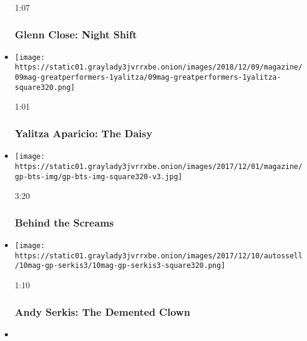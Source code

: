 \begin{itemize}
  1:07

  \hypertarget{glenn-close-night-shift}{%
  \subsubsection{Glenn Close: Night
  Shift}\label{glenn-close-night-shift}}
\item
  \href{https://www.nytimes3xbfgragh.onion/video/magazine/100000006246384/yalitza-aparicio-the-daisy.html?action=click\&module=video-series-bar\&region=header\&pgtype=Article\&playlistId=video/great-performers}{}

  \texttt{[image: https://static01.graylady3jvrrxbe.onion/images/2018/12/09/magazine/09mag-greatperformers-1yalitza/09mag-greatperformers-1yalitza-square320.png]}

  1:01

  \hypertarget{yalitza-aparicio-the-daisy}{%
  \subsubsection{Yalitza Aparicio: The
  Daisy}\label{yalitza-aparicio-the-daisy}}
\item
  \href{https://www.nytimes3xbfgragh.onion/video/magazine/100000005593268/behind-the-screams.html?action=click\&module=video-series-bar\&region=header\&pgtype=Article\&playlistId=video/great-performers}{}

  \texttt{[image: https://static01.graylady3jvrrxbe.onion/images/2017/12/01/magazine/gp-bts-img/gp-bts-img-square320-v3.jpg]}

  3:20

  \hypertarget{behind-the-screams}{%
  \subsubsection{Behind the Screams}\label{behind-the-screams}}
\item
  \href{https://www.nytimes3xbfgragh.onion/video/magazine/100000005588849/andy-serkis-the-demented-clown.html?action=click\&module=video-series-bar\&region=header\&pgtype=Article\&playlistId=video/great-performers}{}

  \texttt{[image: https://static01.graylady3jvrrxbe.onion/images/2017/12/10/autossell/10mag-gp-serkis3/10mag-gp-serkis3-square320.png]}

  1:10

  \hypertarget{andy-serkis-the-demented-clown}{%
  \subsubsection{Andy Serkis: The Demented
  Clown}\label{andy-serkis-the-demented-clown}}
\item
  \href{https://www.nytimes3xbfgragh.onion/video/magazine/100000005588864/timothee-chalamet-the-cannibal.html?action=click\&module=video-series-bar\&region=header\&pgtype=Article\&playlistId=video/great-performers}{}


\end{itemize}
